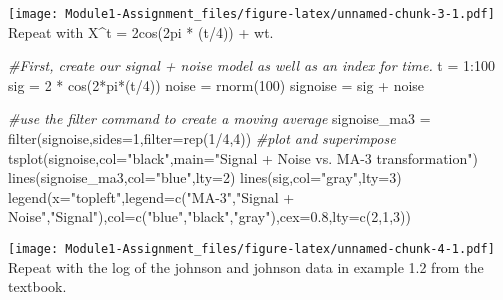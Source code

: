 \documentclass[
]{article}
\newenvironment{Shaded}{\begin{snugshade}}{\end{snugshade}}
\newcommand{\AttributeTok}[1]{\textcolor[rgb]{0.77,0.63,0.00}{#1}}
\newcommand{\CommentTok}[1]{\textcolor[rgb]{0.56,0.35,0.01}{\textit{#1}}}
\newcommand{\DecValTok}[1]{\textcolor[rgb]{0.00,0.00,0.81}{#1}}
\newcommand{\FloatTok}[1]{\textcolor[rgb]{0.00,0.00,0.81}{#1}}
\newcommand{\FunctionTok}[1]{\textcolor[rgb]{0.00,0.00,0.00}{#1}}
\newcommand{\NormalTok}[1]{#1}
\newcommand{\OtherTok}[1]{\textcolor[rgb]{0.56,0.35,0.01}{#1}}
\newcommand{\SpecialCharTok}[1]{\textcolor[rgb]{0.00,0.00,0.00}{#1}}
\newcommand{\StringTok}[1]{\textcolor[rgb]{0.31,0.60,0.02}{#1}}
\begin{document}
\texttt{[image: Module1-Assignment\_files/figure-latex/unnamed-chunk-3-1.pdf]}
Repeat with X\^{}t = 2cos(2pi * (t/4)) + wt.

\begin{Shaded}
\begin{Highlighting}[]
\CommentTok{\#First, create our signal + noise model as well as an index for time.}
\NormalTok{t }\OtherTok{=} \DecValTok{1}\SpecialCharTok{:}\DecValTok{100}
\NormalTok{sig }\OtherTok{=} \DecValTok{2} \SpecialCharTok{*} \FunctionTok{cos}\NormalTok{(}\DecValTok{2}\SpecialCharTok{*}\NormalTok{pi}\SpecialCharTok{*}\NormalTok{(t}\SpecialCharTok{/}\DecValTok{4}\NormalTok{))}
\NormalTok{noise }\OtherTok{=} \FunctionTok{rnorm}\NormalTok{(}\DecValTok{100}\NormalTok{)}
\NormalTok{signoise }\OtherTok{=}\NormalTok{ sig }\SpecialCharTok{+}\NormalTok{ noise }

\CommentTok{\#use the filter command to create a moving average}
\NormalTok{signoise\_ma3 }\OtherTok{=} \FunctionTok{filter}\NormalTok{(signoise,}\AttributeTok{sides=}\DecValTok{1}\NormalTok{,}\AttributeTok{filter=}\FunctionTok{rep}\NormalTok{(}\DecValTok{1}\SpecialCharTok{/}\DecValTok{4}\NormalTok{,}\DecValTok{4}\NormalTok{))}
\CommentTok{\#plot and superimpose}
\FunctionTok{tsplot}\NormalTok{(signoise,}\AttributeTok{col=}\StringTok{"black"}\NormalTok{,}\AttributeTok{main=}\StringTok{"Signal + Noise vs. MA{-}3 transformation"}\NormalTok{)}
\FunctionTok{lines}\NormalTok{(signoise\_ma3,}\AttributeTok{col=}\StringTok{"blue"}\NormalTok{,}\AttributeTok{lty=}\DecValTok{2}\NormalTok{)}
\FunctionTok{lines}\NormalTok{(sig,}\AttributeTok{col=}\StringTok{"gray"}\NormalTok{,}\AttributeTok{lty=}\DecValTok{3}\NormalTok{)}
\FunctionTok{legend}\NormalTok{(}\AttributeTok{x=}\StringTok{"topleft"}\NormalTok{,}\AttributeTok{legend=}\FunctionTok{c}\NormalTok{(}\StringTok{"MA{-}3"}\NormalTok{,}\StringTok{"Signal + Noise"}\NormalTok{,}\StringTok{"Signal"}\NormalTok{),}\AttributeTok{col=}\FunctionTok{c}\NormalTok{(}\StringTok{"blue"}\NormalTok{,}\StringTok{"black"}\NormalTok{,}\StringTok{"gray"}\NormalTok{),}\AttributeTok{cex=}\FloatTok{0.8}\NormalTok{,}\AttributeTok{lty=}\FunctionTok{c}\NormalTok{(}\DecValTok{2}\NormalTok{,}\DecValTok{1}\NormalTok{,}\DecValTok{3}\NormalTok{))}
\end{Highlighting}
\end{Shaded}

\texttt{[image: Module1-Assignment\_files/figure-latex/unnamed-chunk-4-1.pdf]}
Repeat with the log of the johnson and johnson data in example 1.2 from
the textbook.
\end{document}
